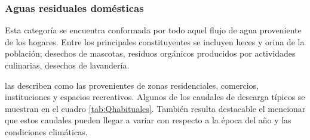 \subsubsection{Aguas residuales domésticas}
Esta categoría se encuentra conformada por todo aquel flujo de agua proveniente de los hogares\sloppy. Entre los principales constituyentes se incluyen heces y orina de la población; desechos de mascotas, residuos orgánicos producidos por actividades culinarias, desechos de lavandería.\par
\cite{crites2000} las describen como las provenientes de zonas residenciales, comercios, instituciones y espacios recreativos. Algunos de los caudales de descarga típicos se muestran en el cuadro \ref{tab:Qhabituales}. También resulta destacable el mencionar que estos caudales pueden llegar a variar con respecto a la época del año y las condiciones climáticas.\par
